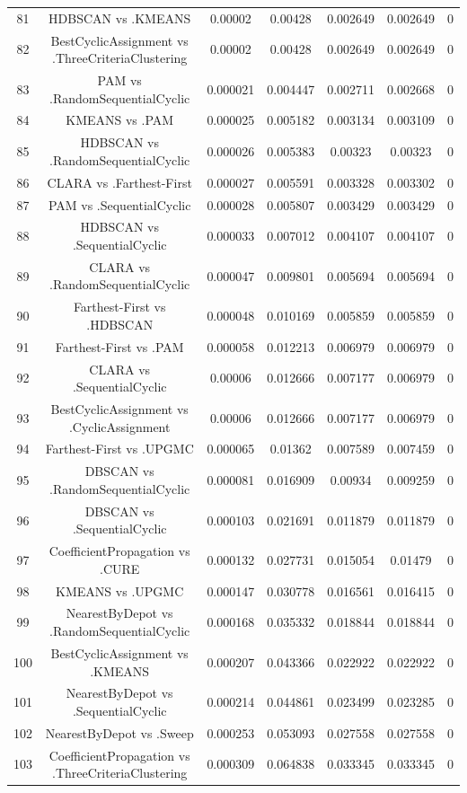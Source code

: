 \documentclass[a4paper,10pt]{article}
\begin{document}
\begin{landscape}
\begin{table}[!htp]
\begin{tabular}{ccccccc}
81&HDBSCAN vs .KMEANS&0.00002&0.00428&0.002649&0.002649&0\\
82&BestCyclicAssignment vs .ThreeCriteriaClustering&0.00002&0.00428&0.002649&0.002649&0\\
83&PAM vs .RandomSequentialCyclic&0.000021&0.004447&0.002711&0.002668&0\\
84&KMEANS vs .PAM&0.000025&0.005182&0.003134&0.003109&0\\
85&HDBSCAN vs .RandomSequentialCyclic&0.000026&0.005383&0.00323&0.00323&0\\
86&CLARA vs .Farthest-First&0.000027&0.005591&0.003328&0.003302&0\\
87&PAM vs .SequentialCyclic&0.000028&0.005807&0.003429&0.003429&0\\
88&HDBSCAN vs .SequentialCyclic&0.000033&0.007012&0.004107&0.004107&0\\
89&CLARA vs .RandomSequentialCyclic&0.000047&0.009801&0.005694&0.005694&0\\
90&Farthest-First vs .HDBSCAN&0.000048&0.010169&0.005859&0.005859&0\\
91&Farthest-First vs .PAM&0.000058&0.012213&0.006979&0.006979&0\\
92&CLARA vs .SequentialCyclic&0.00006&0.012666&0.007177&0.006979&0\\
93&BestCyclicAssignment vs .CyclicAssignment&0.00006&0.012666&0.007177&0.006979&0\\
94&Farthest-First vs .UPGMC&0.000065&0.01362&0.007589&0.007459&0\\
95&DBSCAN vs .RandomSequentialCyclic&0.000081&0.016909&0.00934&0.009259&0\\
96&DBSCAN vs .SequentialCyclic&0.000103&0.021691&0.011879&0.011879&0\\
97&CoefficientPropagation vs .CURE&0.000132&0.027731&0.015054&0.01479&0\\
98&KMEANS vs .UPGMC&0.000147&0.030778&0.016561&0.016415&0\\
99&NearestByDepot vs .RandomSequentialCyclic&0.000168&0.035332&0.018844&0.018844&0\\
100&BestCyclicAssignment vs .KMEANS&0.000207&0.043366&0.022922&0.022922&0\\
101&NearestByDepot vs .SequentialCyclic&0.000214&0.044861&0.023499&0.023285&0\\
102&NearestByDepot vs .Sweep&0.000253&0.053093&0.027558&0.027558&0\\
103&CoefficientPropagation vs .ThreeCriteriaClustering&0.000309&0.064838&0.033345&0.033345&0\\

\end{tabular}
\end{table}
\end{landscape}
\end{document}
